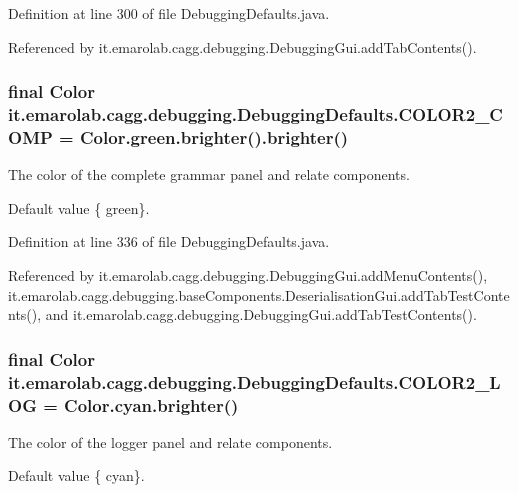 Definition at line 300 of file Debugging\-Defaults.\-java.



Referenced by it.\-emarolab.\-cagg.\-debugging.\-Debugging\-Gui.\-add\-Tab\-Contents().

\hypertarget{classit_1_1emarolab_1_1cagg_1_1debugging_1_1DebuggingDefaults_a8b051f6641a8ed71cbc44a02f559a479}{
\subsubsection[{C\-O\-L\-O\-R2\-\_\-\-C\-O\-M\-P}]{\setlength{\rightskip}{0pt plus 5cm}final Color it.\-emarolab.\-cagg.\-debugging.\-Debugging\-Defaults.\-C\-O\-L\-O\-R2\-\_\-\-C\-O\-M\-P = Color.\-green.\-brighter().brighter()\hspace{0.3cm}{\ttfamily [static]}}}\label{classit_1_1emarolab_1_1cagg_1_1debugging_1_1DebuggingDefaults_a8b051f6641a8ed71cbc44a02f559a479}
The color of the complete grammar panel and relate components. \par
 Default value \{ green\}. 

Definition at line 336 of file Debugging\-Defaults.\-java.



Referenced by it.\-emarolab.\-cagg.\-debugging.\-Debugging\-Gui.\-add\-Menu\-Contents(), it.\-emarolab.\-cagg.\-debugging.\-base\-Components.\-Deserialisation\-Gui.\-add\-Tab\-Test\-Contents(), and it.\-emarolab.\-cagg.\-debugging.\-Debugging\-Gui.\-add\-Tab\-Test\-Contents().

\hypertarget{classit_1_1emarolab_1_1cagg_1_1debugging_1_1DebuggingDefaults_a7d5db3f257ab457fb097b27d480e67c9}{
\subsubsection[{C\-O\-L\-O\-R2\-\_\-\-L\-O\-G}]{\setlength{\rightskip}{0pt plus 5cm}final Color it.\-emarolab.\-cagg.\-debugging.\-Debugging\-Defaults.\-C\-O\-L\-O\-R2\-\_\-\-L\-O\-G = Color.\-cyan.\-brighter()\hspace{0.3cm}{\ttfamily [static]}}}\label{classit_1_1emarolab_1_1cagg_1_1debugging_1_1DebuggingDefaults_a7d5db3f257ab457fb097b27d480e67c9}
The color of the logger panel and relate components. \par
 Default value \{ cyan\}. 

